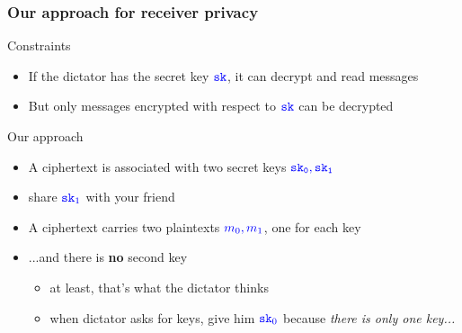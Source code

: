 \documentclass[]{beamer}
\newcommand{\objfont}[1]{{\mathtt{#1}}}
\newcommand{\sk}{\objfont{sk}}      %
\begin{document}
\begin{frame}
\frametitle{Our approach for receiver privacy}
\pause
\begin{block}{Constraints}
\begin{itemize}
\item If the dictator has the secret key $\color{blue} \mathtt{sk}$,
        it can decrypt and read messages

\item But only messages encrypted with respect to $\color{blue} \mathtt{sk}$ can be decrypted

\end{itemize}
\end{block}

\pause
\vfill

\begin{block}{Our approach}
\begin{itemize}
\item A ciphertext is associated with {\color{purple} two} secret keys 
$\color{blue} \mathtt{sk_0,sk_1}$
\item share $\color{blue}\sk_1$ with your friend
\item A ciphertext carries two plaintexts $\color{blue} m_0,m_1$,
one for each key
\item {\color{brown} ...and there is {\bf no} second key}
    \begin{itemize}
        \item at least, that's what the dictator thinks
        \item when dictator asks for keys, give him $\color{blue}\sk_0$ because
        {\em\color{teal} there is only one key...}
    \end{itemize}
\end{itemize}
\end{block}
\end{frame}
\end{document}
